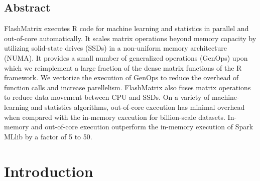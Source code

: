 \documentclass[letterpaper,twocolumn,10pt]{article}
\begin{document}
\subsection*{Abstract}
FlashMatrix executes R code for machine learning and statistics 
in parallel and out-of-core automatically.
%
%
%
It scales matrix operations
beyond memory capacity by utilizing solid-state drives (SSDs) in a non-uniform
memory architecture (NUMA). It provides a small number of generalized 
operations (GenOps) upon which we reimplement a large fraction of the dense 
matrix functions of the R framework.
We vectorize the execution of GenOps to reduce the overhead of function calls
and increase parellelism.
FlashMatrix also fuses matrix operations to reduce data movement between CPU and
SSDs. 
On a variety of machine-learning and statistics algorithms, 
out-of-core execution has minimal overhead when compared with the in-memory execution
for billion-scale datasets.
In-memory and out-of-core execution outperform the in-memory execution of
Spark MLlib by a factor of 5 to 50.

\vspace{-10pt}
\section{Introduction}
\vspace{-5pt}


\vspace{-10pt}
\end{document}
